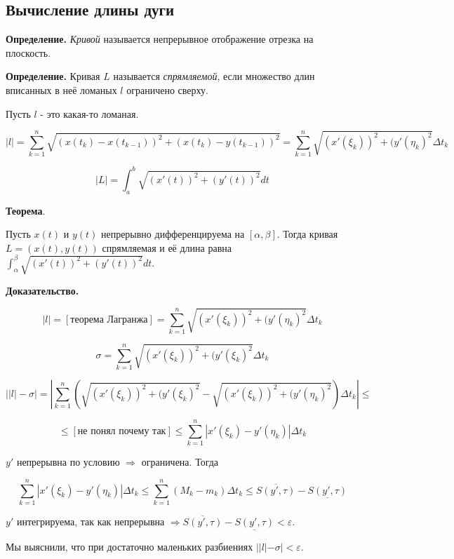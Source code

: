 \documentclass[a4paper]{article}
\begin{document}
\begin{definit}
\hypertarget{p20}{}
\subsection*{Вычисление длины дуги}

\textbf{Определение.} \textit{Кривой} называется непрерывное отображение отрезка на плоскость.

\textbf{Определение.}  Кривая $L$ называется \textit{спрямляемой}, если множество длин вписанных в неё ломаных $l$ ограничено сверху.

Пусть $l$ - это какая-то ломаная. 

\[
|l| = \sum_{k=1}^n \sqrt{(x(t_k) - x(t_{k-1}))^2 + (x(t_k) - y(t_{k-1}))^2} = \sum_{k=1}^n \sqrt{(x'(\xi_k))^2 + (y'(\eta_k)^2} \Delta t_k
\]

\[
|L| =  \int_a^b \sqrt{(x'(t))^2 + (y'(t))^2} dt
\]

\begin{htheorem}\textbf{Теорема}.

Пусть $x(t)$ и $y(t)$ непрерывно дифференцируема на $[\alpha, \beta]$. Тогда кривая
$L =(x(t), y(t))$ спрямляемая и её длина равна $\int_{\alpha}^{\beta} \sqrt{(x'(t))^2+(y'(t))^2} dt$.
\end{htheorem}

\begin{hproof}\textbf{Доказательство.}


\[
|l| = [\text{теорема Лагранжа}] = \sum_{k=1}^n \sqrt{(x'(\xi_k))^2 + (y'(\eta_k)^2} \Delta t_k
\]

\[
\sigma = \sum_{k=1}^n \sqrt{(x'(\xi_k))^2 + (y'(\xi_k)^2} \Delta t_k
\]

\[
\left| |l| - \sigma \right| = \left| \sum_{k=1}^n \left( \sqrt{(x'(\xi_k))^2 + (y'(\xi_k)^2} - \sqrt{(x'(\xi_k))^2 + (y'(\eta_k)^2} \right) \Delta t_k \right| \leq 
\]

\[
\leq [\text{не понял почему так}] \leq \sum_{k=1}^n \left| x'(\xi_k) - y'(\eta_k) \right| \Delta t_k
\]

$y'$ непрерывна по условию $\Rightarrow$ ограничена. Тогда 

\[
\sum_{k=1}^n \left| x'(\xi_k) - y'(\eta_k) \right| \Delta t_k \leq \sum_{k=1}^n (M_k - m_k) \Delta t_k \leq \overline{S(y', \tau)} - \underline{S(y', \tau)}
\]

$y'$ интегрируема, так как непрерывна $\Rightarrow \overline{S(y', \tau)} - \underline{S(y', \tau)} < \varepsilon$.

Мы выяснили, что при достаточно маленьких разбиениях $||l|-\sigma| < \varepsilon$.



\end{hproof}
\end{definit}
\end{document}
